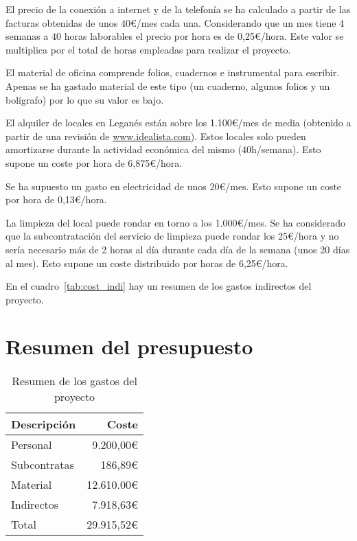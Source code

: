 El precio de la conexión a internet y de la telefonía se ha calculado a partir de las facturas obtenidas de unos 40\euro/mes cada una. Considerando que un mes tiene 4 semanas a 40 horas laborables el precio por hora es de 0,25\euro/hora. Este valor se multiplica por el total de horas empleadas para realizar el proyecto.

El material de oficina comprende folios, cuadernos e instrumental para escribir. Apenas se ha gastado material de este tipo (un cuaderno, algunos folios y un bolígrafo) por lo que su valor es bajo.

El alquiler de locales en Leganés están sobre los 1.100\euro/mes de media (obtenido a partir de una revisión de \url{www.idealista.com}). Estos locales solo pueden amortizarse durante la actividad económica del mismo (40h/semana). Esto supone un coste por hora de 6,875\euro/hora.

Se ha supuesto un gasto en electricidad de unos 20\euro/mes. Esto supone un coste por hora de 0,13\euro/hora.

La limpieza del local puede rondar en torno a los 1.000\euro/mes. Se ha considerado que la subcontratación del servicio de limpieza puede rondar los 25\euro/hora y no sería necesario más de 2 horas al día durante cada día de la semana (unos 20 días al mes). Esto supone un coste distribuido por horas de 6,25\euro/hora.

En el cuadro~\ref{tab:cost_indi} hay un resumen de los gastos indirectos del proyecto.

\section{Resumen del presupuesto}

\begin{table}
	\centering
	
	\begin{tabular}{|l|r|}
		\hline
		Descripción  & Coste  \\
		\hline
		Personal     & 9.200,00\euro \\
		\hline
		Subcontratas & 186,89\euro \\
		\hline
		Material     & 12.610.00\euro\\
		\hline
		Indirectos   & 7.918,63\euro\\
		\hline
		\hline
		Total        & 29.915,52\euro\\
		\hline
	\end{tabular}
	\caption{Resumen de los gastos del proyecto}\label{tab:resu_gastos}
\end{table}

